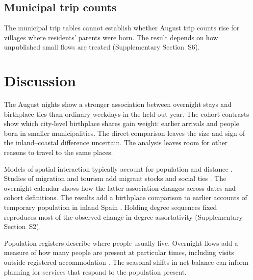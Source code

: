 \documentclass[pdflatex,sn-mathphys-num,referee]{sn-jnl}
\begin{document}
\subsection{Municipal trip counts}

The municipal trip tables cannot establish whether August trip counts rise for villages where residents' parents were born. The result depends on how unpublished small flows are treated (Supplementary Section~S6).

\FloatBarrier
\section{Discussion}\label{sec:discussion}

The August nights show a stronger association between overnight stays and birthplace ties than ordinary weekdays in the held-out year. The cohort contrasts show which city-level birthplace shares gain weight: earlier arrivals and people born in smaller municipalities. The direct comparison leaves the size and sign of the inland--coastal difference uncertain. The analysis leaves room for other reasons to travel to the same places.

Models of spatial interaction typically account for population and distance \cite{simini2012universal,lenormand2016systematic,barbosa2018human}. Studies of migration and tourism add migrant stocks and social ties \cite{etzo2014migration,santanagallego2022tourism,bailey2018social,janta2015rethinking}. The overnight calendar shows how the latter association changes across dates and cohort definitions. The results add a birthplace comparison to earlier accounts of temporary population in inland Spain \cite{garciagonzalez2024retorno,delgadourrecho2014importancia}. Holding degree sequences fixed reproduces most of the observed change in degree assortativity (Supplementary Section~S2).

Population registers describe where people usually live. Overnight flows add a measure of how many people are present at particular times, including visits outside registered accommodation \cite{back2017mapping,vinuesa2005poblacion,garciagonzalez2024retorno}. The seasonal shifts in net balance can inform planning for services that respond to the population present.
\end{document}
